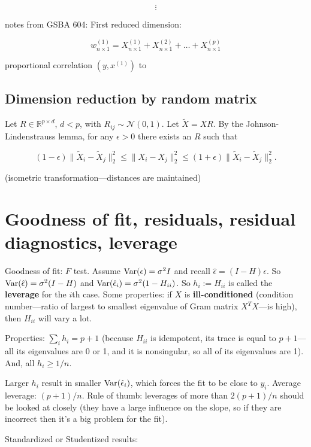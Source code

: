 \[
\vdots
\]

notes from GSBA 604: First reduced dimension:

\[
w_{n \times 1}^{(1)} = X_{n \times 1}^{(1)} + X_{n \times 1}^{(2)} + \ldots + X_{n \times 1}^{(p)} 
\]

proportional correlation \((y, x^{(1)})\) to

\subsection{Dimension reduction by random matrix}

Let \(R \in \mathbb{R}^{p \times d}\), \(d < p\), with \(R_{ij} \sim \mathcal{N}(0, 1)\). Let \(\tilde{X} = X R\). By the Johnson-Lindenstrauss lemma, for any \(\epsilon > 0\) there exists an \(R\) such that 

\[
(1 - \epsilon) \lVert \tilde{X}_i - \tilde{X}_j \rVert_2^2 \leq \lVert X_i - X_j \rVert_2^2 \leq (1 + \epsilon) \lVert \tilde{X}_i - \tilde{X}_j \rVert_2^2. 
\]

(isometric transformation---distances are maintained)

\section{Goodness of fit, residuals, residual diagnostics, leverage}

Goodness of fit: \(F\) test. Assume \(\mathrm{Var}(\epsilon) = \sigma^2I\) and recall \(\hat{\epsilon} = (I - H)\epsilon\). So \(\mathrm{Var}(\hat{\epsilon}) = \sigma^2(I - H)\) and \(\mathrm{Var}(\hat{\epsilon}_i) = \sigma^2(1 - H_{ii})\). So \(h_i := H_{ii}\) is called the \textbf{leverage} for the \(i\)th case. Some properties: if \(X\) is \textbf{ill-conditioned} (condition number---ratio of largest to smallest eigenvalue of Gram matrix \(X^TX\)---is high), then \(H_{ii}\) will vary a lot.

Properties: \(\sum_i h_i = p + 1\) (because \(H_{ii}\) is idempotent, its trace is equal to \(p+1\)---all its eigenvalues are 0 or 1, and it is nonsingular, so all of its eigenvalues are 1). And, all \(h_i \geq 1/n\).

Larger \(h_i\) result in smaller \(\mathrm{Var}(\hat{\epsilon}_i)\), which forces the fit to be close to \(y_i\). Average leverage: \((p+1)/n\). Rule of thumb: leverages of more than \(2(p+1)/n\) should be looked at closely (they have a large influence on the slope, so if they are incorrect then it's a big problem for the fit).

Standardized or Studentized results:

